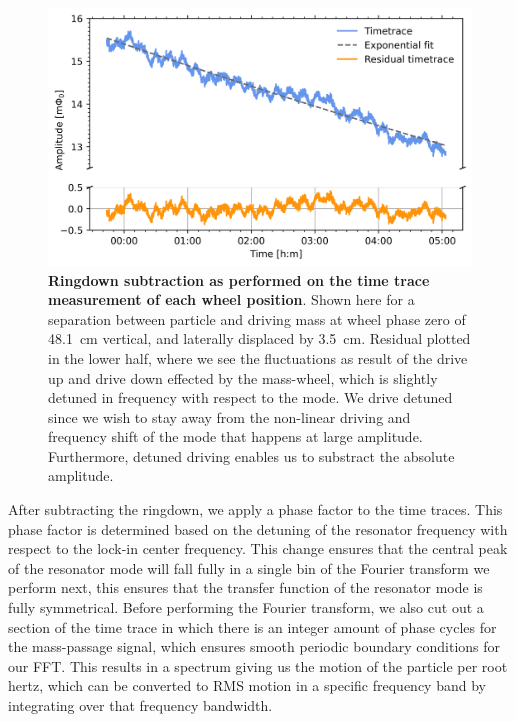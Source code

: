 \begin{appendices}
\begin{figure}[ht]
\centering
\includegraphics[width=\textwidth]{Appenidx/paper_Ringdown_Subtract.png}%
\caption{\textbf{Ringdown subtraction as performed on the time trace measurement of each wheel position}. Shown here for a separation between particle and driving mass at wheel phase zero of \SI{48.1}{cm} vertical, and laterally displaced by \SI{3.5}{cm}. Residual plotted in the lower half, where we see the fluctuations as result of the drive up and drive down effected by the mass-wheel, which is slightly detuned in frequency with respect to the mode. We drive detuned since we wish to stay away from the non-linear driving and frequency shift of the mode that happens at large amplitude. Furthermore, detuned driving enables us to substract the absolute amplitude.}%
\end{figure}

After subtracting the ringdown, we apply a phase factor to the time traces. This phase factor is determined based on the detuning of the resonator frequency with respect to the lock-in center frequency. This change ensures that the central peak of the resonator mode will fall fully in a single bin of the Fourier transform we perform next, this ensures that the transfer function of the resonator mode is fully symmetrical. Before performing the Fourier transform, we also cut out a section of the time trace in which there is an integer amount of phase cycles for the mass-passage signal, which ensures smooth periodic boundary conditions for our FFT.
This results in a spectrum giving us the motion of the particle per root hertz, which can be converted to RMS motion in a specific frequency band by integrating over that frequency bandwidth.


\end{appendices}
